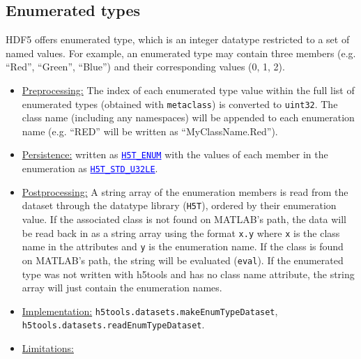 \documentclass[11pt]{exam}
\newcommand\myurl[1]{\textcolor{blue}{\underline{#1}}}
\newcommand\myfcn[1]{\colorbox{codegray}{\textcolor{codeblue}{\texttt{#1}}}}
\newcommand\matfcn[1]{\textcolor{darkteal}{\texttt{#1}}}
\newcommand\hdftype[1]{\texttt{\myurl{#1}}}
\begin{document}
		\subsection{Enumerated types}
		\noindent HDF5 offers enumerated type, which is an integer datatype restricted to a set of named values. For example, an enumerated type may contain three members (e.g. ``Red'', ``Green'', ``Blue'') and their corresponding values (0, 1, 2).
		\begin{itemize}
			\item \underline{Preprocessing:} The index of each enumerated type value within the full list of enumerated types (obtained with \matfcn{metaclass}) is converted to \texttt{uint32}. The class name (including any namespaces) will be appended to each enumeration name (e.g. ``RED'' will be written as ``MyClassName.Red'').
			\item \underline{Persistence:} written as \myurl{\texttt{H5T\_ENUM}} with the values of each member in the enumeration as \hdftype{H5T\_STD\_U32LE}. 
			\item \underline{Postprocessing:} A string array of the enumeration members is read from the dataset through the datatype library (\texttt{H5T}), ordered by their enumeration value. If the associated class is not found on MATLAB's path, the data will be read back in as a string array using the format \texttt{x.y} where \texttt{x} is the class name in the attributes and \texttt{y} is the enumeration name. If the class is found on MATLAB's path, the string will be evaluated (\texttt{eval}). If the enumerated type was not written with h5tools and has no class name attribute, the string array will just contain the enumeration names. %
			\item \underline{Implementation:} \myfcn{h5tools.datasets.makeEnumTypeDataset}, \myfcn{h5tools.datasets.readEnumTypeDataset}.
			\item \underline{Limitations:} 
		\end{itemize}
		
\end{document}

